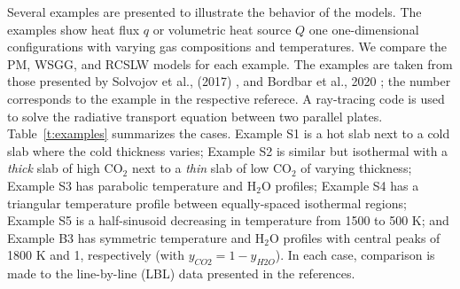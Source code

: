 \documentclass[preprint,12pt, a4paper]{elsarticle}
\begin{document}
Several examples are presented to illustrate the behavior of the models. The examples show heat flux $q$ or volumetric heat source $Q$ one one-dimensional configurations with varying gas compositions and temperatures. We compare the PM, WSGG, and RCSLW models for each example. The examples are taken from those presented by Solvojov et al., (2017) \cite{Solovjov_2017}, and Bordbar et al., 2020 \cite{Bordbar_2020}; the number corresponds to the example in the respective referece. A ray-tracing code is used to solve the radiative transport equation between two parallel plates. 
Table~\ref{t:examples} summarizes the cases. Example S1 is a hot slab next to a cold slab where the cold thickness varies; Example S2 is similar but isothermal with a \emph{thick} slab of high CO$_2$ next to a \emph{thin} slab of low CO$_2$ of varying thickness; Example S3 has parabolic temperature and H$_2$O profiles; Example S4 has a triangular temperature profile between equally-spaced isothermal regions; Example S5 is a half-sinusoid decreasing in temperature from 1500 to 500 K; and Example B3 has symmetric temperature and H$_2$O profiles with central peaks of 1800 K and 1, respectively (with $y_{CO2}=1-y_{H2O}$). In each case, comparison is made to the line-by-line (LBL) data presented in the references. 
%
\end{document}
